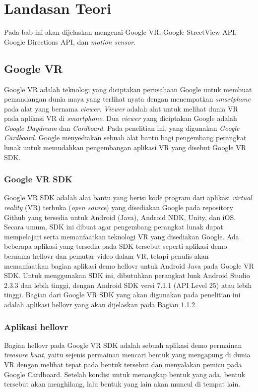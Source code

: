 \chapter{Landasan Teori}
\label{chap:teori}
Pada bab ini akan dijelaskan mengenai Google VR, Google StreetView API, Google Directions API, dan \textit{motion sensor}.

\section{Google VR}
\label{sec:google-vr} 
Google VR adalah teknologi yang diciptakan perusahaan Google untuk membuat pemandangan dunia maya yang terlihat nyata dengan menempatkan \textit{smartphone} pada alat yang bernama \textit{viewer}. \textit{Viewer} adalah alat untuk melihat dunia VR pada aplikasi VR di \textit{smartphone}. Dua \textit{viewer} yang diciptakan Google adalah \textit{Google Daydream} dan \textit{Cardboard}. Pada penelitian ini, yang digunakan \textit{Google Cardboard}. Google menyediakan sebuah alat bantu bagi pengembang perangkat lunak untuk memudahkan pengembangan aplikasi VR yang disebut Google VR SDK.

\subsection{Google VR SDK}
Google VR SDK adalah alat bantu yang berisi kode program dari aplikasi {\it virtual reality} (VR) terbuka (\textit{open source}) yang disediakan Google pada repository Github yang tersedia untuk Android (Java), Android NDK, Unity, dan iOS. Secara umum, SDK ini dibuat agar pengembang perangkat lunak dapat mempelajari serta memanfaatkan teknologi VR yang disediakan Google. Ada beberapa aplikasi yang tersedia pada SDK tersebut seperti aplikasi demo bernama hellovr dan pemutar video dalam VR, tetapi penulis akan memanfaatkan bagian aplikasi demo hellovr untuk Android Java pada Google VR SDK. Untuk menggunakan SDK ini, dibutuhkan perangkat lunk Android Studio 2.3.3 dan lebih tinggi, dengan Android SDK versi 7.1.1 (API Level 25) atau lebih tinggi. Bagian dari Google VR SDK yang akan digunakan pada penelitian ini adalah aplikasi hellovr yang akan dijelaskan pada Bagian \ref{subs:hellovr}. 

\subsection{Aplikasi hellovr}
\label{subs:hellovr}
Bagian hellovr pada Google VR SDK adalah sebuah aplikasi demo permainan \textit{treasure hunt}, yaitu sejenis permainan mencari bentuk yang mengapung di dunia VR dengan melihat tepat pada bentuk tersebut dan menyalakan pemicu pada Google Cardboard. Setelah kondisi untuk menangkap bentuk yang ada, bentuk tersebut akan menghilang, lalu bentuk yang lain akan muncul di tempat lain. 

